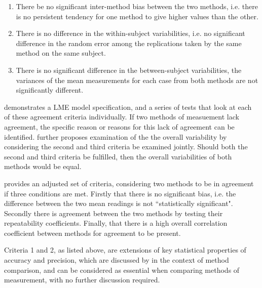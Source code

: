 \documentclass[12pt, a4paper]{report}
\theoremstyle{plain}
\theoremstyle{definition}
\theoremstyle{remark}
\begin{document}
\begin{enumerate}
\item There be no significant inter-method bias between the two methods, i.e. there is no persistent tendency for one method to give higher values than the other.
\item There is no difference in the within-subject variabilities, i.e. no significant difference in the random error among the replications taken by the same method on the same subject. 
\item There is no significant difference in the between-subject variabilities, the variances of the mean measurements for each case from both methods are not significantly different.
\end{enumerate} 
\citet{ARoy2009} demonstrates a LME model specification, and a series of tests that look at each of these agreement criteria individually. If two methods of measuement lack agreement, the specific reason or reasons for this lack of agreement can be identified. \citet{ARoy2009} further proposes examination of the the overall variability by considering the second and third criteria be examined jointly. Should both the second and third criteria be fulfilled, then the overall variabilities of both methods would be equal.

\citet{ARoy2009} provides an adjusted set of criteria, considering two methods to be in agreement if three conditions are met. Firstly that there is no significant bias, i.e. the difference between the two
mean readings is not ``statistically significant". Secondly there is
agreement between the two methods by testing their
repeatability coefficients. Finally, that there is a high overall correlation coefficient between methods for agreement to be present.


Criteria 1 and 2, as listed above, are extensions of key statistical properties of accuracy and precision, which are discussed by \citet{Barnhart} in the context of method comparison, and can be considered as essential when comparing methods of measurement, with no further discussion required.

\end{document}

